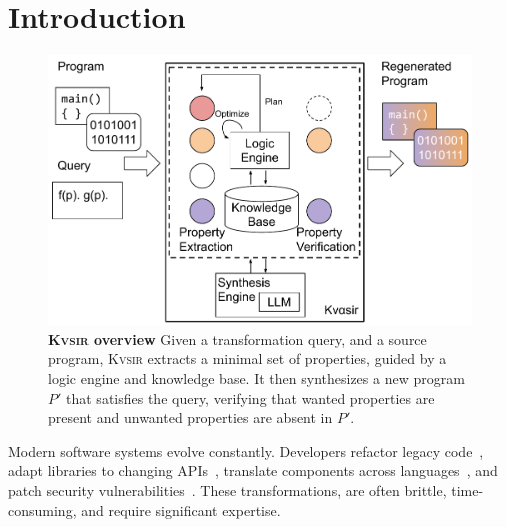 \documentclass[nonacm,sigplan,review]{acmart}
\newcommand{\sys}{{\scshape Kv{\textalpha}sir}\xspace}
\begin{document}
\section{Introduction}
\begin{figure}[t]
  \includegraphics[width=.9\columnwidth]{figs/kvasir_overview.pdf}
  \caption{\textbf{\sys overview}
Given a transformation query, and a source program, \sys extracts a minimal set
  of properties,
  guided by a logic engine and knowledge base.
  It then synthesizes a new program $P'$ that satisfies the query, verifying
  that wanted properties are present and unwanted properties are absent in $P'$.
}
  \label{fig:overview}
\end{figure}





Modern software systems evolve constantly.
Developers refactor legacy code~\cite{Fowler99,Mens04,facebook2010redesigns,dropbox2014syncengine},
adapt libraries to changing APIs~\cite{dig2005role,kula2017empiricalstudyimpactrefactoring},
translate components across languages~\cite{manzoor_cli_python,gaultier_rewrite_cpp},
and patch security vulnerabilities~\cite{ikegami2022userefactoringsecurityvulnerability,schneier2013security_vulnerabilities}.
These transformations, are often brittle, time-consuming, and require significant expertise.
\end{document}
